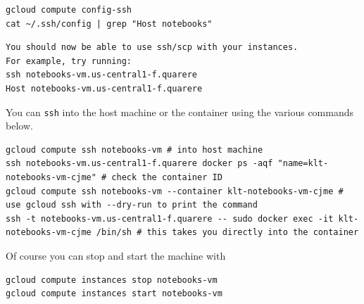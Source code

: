 \documentclass[11pt]{article}
\begin{document}
\begin{enumerate}
\begin{verbatim}
gcloud compute config-ssh
cat ~/.ssh/config | grep "Host notebooks"
\end{verbatim}

\begin{verbatim}
You should now be able to use ssh/scp with your instances.
For example, try running:
ssh notebooks-vm.us-central1-f.quarere
Host notebooks-vm.us-central1-f.quarere
\end{verbatim}


You can \texttt{ssh} into the host machine or the container using the various commands below.

\begin{verbatim}
gcloud compute ssh notebooks-vm # into host machine
ssh notebooks-vm.us-central1-f.quarere docker ps -aqf "name=klt-notebooks-vm-cjme" # check the container ID
gcloud compute ssh notebooks-vm --container klt-notebooks-vm-cjme # use gcloud ssh with --dry-run to print the command
ssh -t notebooks-vm.us-central1-f.quarere -- sudo docker exec -it klt-notebooks-vm-cjme /bin/sh # this takes you directly into the container
\end{verbatim}

Of course you can stop and start the machine with

\begin{verbatim}
gcloud compute instances stop notebooks-vm
gcloud compute instances start notebooks-vm
\end{verbatim}
\end{enumerate}
\end{document}
